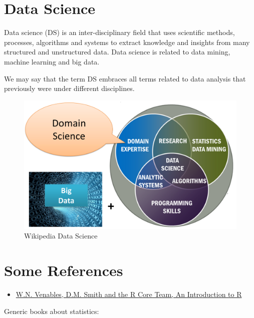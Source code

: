 \documentclass[
]{book}
\providecommand{\tightlist}{%
  \setlength{\itemsep}{0pt}\setlength{\parskip}{0pt}}
\begin{document}
\hypertarget{data-science}{%
\section{Data Science}\label{data-science}}

Data science (DS) is an inter-disciplinary field that uses scientific methods, processes, algorithms and systems to extract knowledge and insights from many structured and unstructured data. Data science is related to data mining, machine learning and big data.

We may say that the term DS embraces all terms related to data analysis that previously were under different disciplines.

\begin{figure}
\centering
\includegraphics{figures/Data_science.png}
\caption{Wikipedia Data Science}
\end{figure}

\hypertarget{some-references}{%
\section{Some References}\label{some-references}}

\begin{itemize}
\tightlist
\item
  \href{https://cran.r-project.org/doc/manuals/r-release/R-intro.pdf}{W.N. Venables, D.M. Smith and the R Core Team, An Introduction to R}
\end{itemize}

Generic books about statistics:
\end{document}
